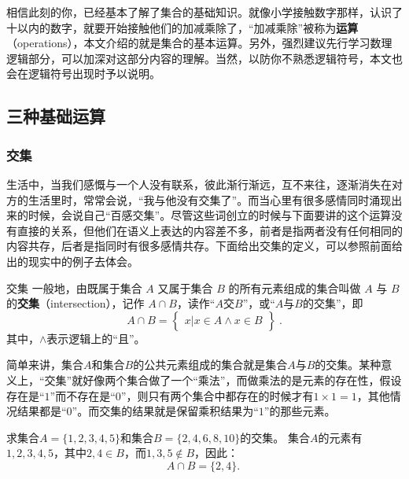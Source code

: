 
\begin{issues}
\issueDraft
\end{issues}
相信此刻的你，已经基本了解了集合的基础知识。就像小学接触数字那样，认识了十以内的数字，就要开始接触他们的加减乘除了，“加减乘除”被称为\textbf{运算}（operations），本文介绍的就是集合的基本运算。另外，强烈建议先行学习数理逻辑部分，可以加深对这部分内容的理解。当然，以防你不熟悉逻辑符号，本文也会在逻辑符号出现时予以说明。

\subsection{三种基础运算}

\subsubsection{交集}

生活中，当我们感慨与一个人没有联系，彼此渐行渐远，互不来往，逐渐消失在对方的生活里时，常常会说，“我与他没有交集了”。而当心里有很多感情同时涌现出来的时候，会说自己“百感交集”。尽管这些词创立的时候与下面要讲的这个运算没有直接的关系，但他们在语义上表达的内容差不多，前者是指两者没有任何相同的内容共存，后者是指同时有很多感情共存。下面给出交集的定义，可以参照前面给出的现实中的例子去体会。

\begin{definition}{交集}
一般地，由既属于集合 $A$ 又属于集合 $B$ 的所有元素组成的集合叫做 $A$ 与 $B$ 的\textbf{交集}（intersection），记作 $A \cap B$，读作“$A$交$B$”，或“$A$与$B$的交集”，即
\begin{equation}
A\cap B = \begin{Bmatrix} x|x\in A\land x\in B \end{Bmatrix}~.
\end{equation}
其中，$\land$表示逻辑上的“且”。
\end{definition}

简单来讲，集合$A$和集合$B$的公共元素组成的集合就是集合$A$与$B$的交集。某种意义上，“交集”就好像两个集合做了一个“乘法”，而做乘法的是元素的存在性，假设存在是“$1$”而不存在是“$0$”，则只有两个集合中都存在的时候才有$1\times 1=1$，其他情况结果都是“$0$”。而交集的结果就是保留乘积结果为“$1$”的那些元素。

\begin{example}{求集合$A=\{1,2,3,4,5\}$和集合$B=\{2,4,6,8,10\}$的交集。}
集合$A$的元素有$1,2,3,4,5$，其中$2,4\in B$，而$1,3,5\notin B$，因此：
$$
A\cap B=\{2,4\}.~
$$
\end{example}

